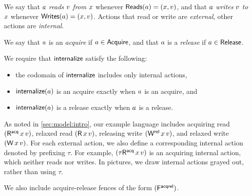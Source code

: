 We say that $a$ \emph{reads} $v$ \emph{from} $x$ whenever
$\mathsf{Reads}(a) = (x,v)$, and that $a$ \emph{writes} $v$
\emph{to} $x$ whenever $\mathsf{Writes}(a) = (x,v)$.  Actions that
read or write are \emph{external}, other actions are \emph{internal}.

We say that $a$ is an \emph{acquire} if $a\in\mathsf{Acquire}$, and that $a$
is a \emph{release} if $a\in\mathsf{Release}$.  

We require that $\mathsf{internalize}$ satisfy the following:
\begin{itemize}
\item the codomain of $\mathsf{internalize}$ includes only internal actions, %
\item $\mathsf{internalize}(a)$ is an acquire exactly when $a$ is an acquire, and 
\item $\mathsf{internalize}(a)$ is a release exactly when $a$ is a release.
\end{itemize}

As noted in \textsection\ref{sec:model:intro}, our example language includes acquiring
read $(\DRAcq{\aLoc}{\aVal})$, relaxed read $(\DR{\aLoc}{\aVal})$, releasing
write $(\DWRel{\aLoc}{\aVal})$, and relaxed write $(\DW{\aLoc}{\aVal})$.
For each external action, we also define a corresponding internal action
denoted by prefixing $\tau$.
For example, $(\iDRAcq{\aLoc}{\aVal})$ is an acquiring internal action, which
neither reads nor writes. In pictures, we draw internal actions grayed out,
rather than using $\tau$.  %

We also include acquire-release fences of the form $(\mathsf{F}^{\mathsf{acqrel}})$.


